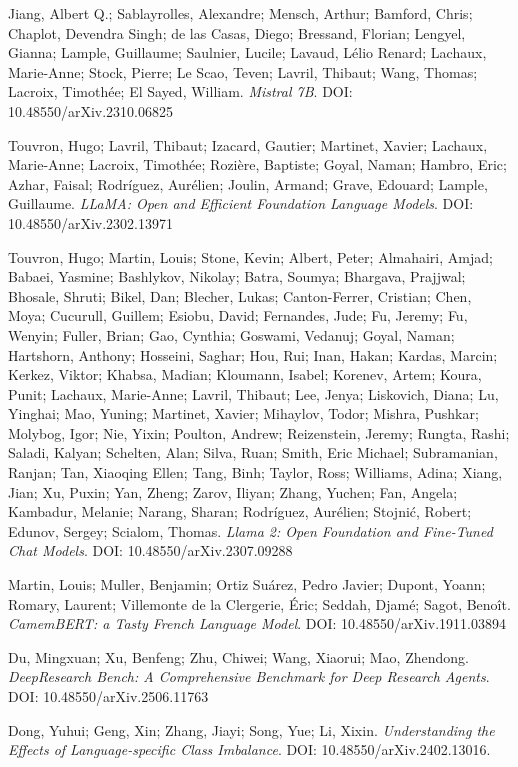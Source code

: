 \documentclass[12pt]{article}
\begin{document}
\begin{thebibliography}{9}
Jiang, Albert Q.; Sablayrolles, Alexandre; Mensch, Arthur; Bamford, Chris; Chaplot, Devendra Singh; de las Casas, Diego; Bressand, Florian; Lengyel, Gianna; Lample, Guillaume; Saulnier, Lucile; Lavaud, Lélio Renard; Lachaux, Marie-Anne; Stock, Pierre; Le Scao, Teven; Lavril, Thibaut; Wang, Thomas; Lacroix, Timothée; El Sayed, William.
\textit{Mistral 7B}.
DOI: 10.48550/arXiv.2310.06825

Touvron, Hugo; Lavril, Thibaut; Izacard, Gautier; Martinet, Xavier; Lachaux, Marie-Anne; Lacroix, Timothée; Rozière, Baptiste; Goyal, Naman; Hambro, Eric; Azhar, Faisal; Rodríguez, Aurélien; Joulin, Armand; Grave, Edouard; Lample, Guillaume.  
\textit{LLaMA: Open and Efficient Foundation Language Models}.  
DOI: 10.48550/arXiv.2302.13971  

Touvron, Hugo; Martin, Louis; Stone, Kevin; Albert, Peter; Almahairi, Amjad; Babaei, Yasmine; Bashlykov, Nikolay; Batra, Soumya; Bhargava, Prajjwal; Bhosale, Shruti; Bikel, Dan; Blecher, Lukas; Canton-Ferrer, Cristian; Chen, Moya; Cucurull, Guillem; Esiobu, David; Fernandes, Jude; Fu, Jeremy; Fu, Wenyin; Fuller, Brian; Gao, Cynthia; Goswami, Vedanuj; Goyal, Naman; Hartshorn, Anthony; Hosseini, Saghar; Hou, Rui; Inan, Hakan; Kardas, Marcin; Kerkez, Viktor; Khabsa, Madian; Kloumann, Isabel; Korenev, Artem; Koura, Punit; Lachaux, Marie-Anne; Lavril, Thibaut; Lee, Jenya; Liskovich, Diana; Lu, Yinghai; Mao, Yuning; Martinet, Xavier; Mihaylov, Todor; Mishra, Pushkar; Molybog, Igor; Nie, Yixin; Poulton, Andrew; Reizenstein, Jeremy; Rungta, Rashi; Saladi, Kalyan; Schelten, Alan; Silva, Ruan; Smith, Eric Michael; Subramanian, Ranjan; Tan, Xiaoqing Ellen; Tang, Binh; Taylor, Ross; Williams, Adina; Xiang, Jian; Xu, Puxin; Yan, Zheng; Zarov, Iliyan; Zhang, Yuchen; Fan, Angela; Kambadur, Melanie; Narang, Sharan; Rodríguez, Aurélien; Stojnić, Robert; Edunov, Sergey; Scialom, Thomas.  
\textit{Llama 2: Open Foundation and Fine-Tuned Chat Models}.  
DOI: 10.48550/arXiv.2307.09288  

Martin, Louis; Muller, Benjamin; Ortiz Suárez, Pedro Javier; Dupont, Yoann; Romary, Laurent; Villemonte de la Clergerie, Éric; Seddah, Djamé; Sagot, Benoît.  
\textit{CamemBERT: a Tasty French Language Model}.  
DOI: 10.48550/arXiv.1911.03894  

Du, Mingxuan; Xu, Benfeng; Zhu, Chiwei; Wang, Xiaorui; Mao, Zhendong.  
\textit{DeepResearch Bench: A Comprehensive Benchmark for Deep Research Agents}.  
DOI: 10.48550/arXiv.2506.11763  

Dong, Yuhui; Geng, Xin; Zhang, Jiayi; Song, Yue; Li, Xixin.
\textit{Understanding the Effects of Language-specific Class Imbalance}.
DOI: 10.48550/arXiv.2402.13016.

\end{thebibliography}
\end{document}
